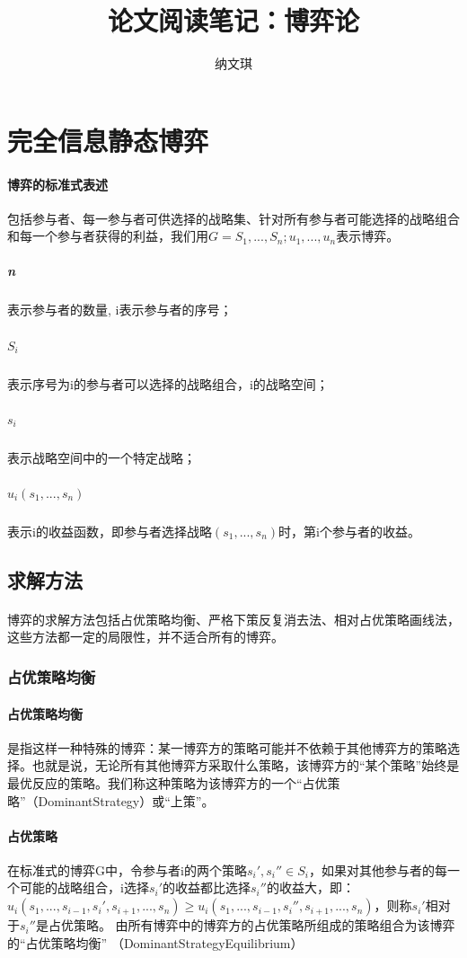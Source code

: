 \documentclass[12pt,a4paper]{article}
\begin{document}

\title{论文阅读笔记：博弈论}
\author{纳文琪}
\maketitle

\section{完全信息静态博弈}
\paragraph{博弈的标准式表述} 包括参与者、每一参与者可供选择的战略集、针对所有参与者可能选择的战略组合和每一个参与者获得的利益，我们用$G={S_1,...,S_n;u_1,...,u_n}$表示博弈。
	\subparagraph{n} 表示参与者的数量, i表示参与者的序号；
	\subparagraph{$S_i$} 表示序号为i的参与者可以选择的战略组合，i的战略空间；
	\subparagraph{$s_i$} 表示战略空间中的一个特定战略；
	\subparagraph{$u_i(s_1,...,s_n)$} 表示i的收益函数，即参与者选择战略$(s_1,...,s_n)$时，第i个参与者的收益。
\subsection{求解方法}	
\paragraph{} 博弈的求解方法包括占优策略均衡、严格下策反复消去法、相对占优策略画线法，这些方法都一定的局限性，并不适合所有的博弈。
\subsubsection{占优策略均衡}
\paragraph{占优策略均衡} 是指这样一种特殊的博弈：某一博弈方的策略可能并不依赖于其他博弈方的策略选择。也就是说，无论所有其他博弈方采取什么策略，该博弈方的“某个策略”始终是最优反应的策略。我们称这种策略为该博弈方的一个“占优策略”（DominantStrategy）或“上策”。
\paragraph{占优策略} 在标准式的博弈G中，令参与者i的两个策略${s_i}',{s_i}'' \in S_i$，如果对其他参与者的每一个可能的战略组合，i选择${s_i}'$的收益都比选择${s_i}''$的收益大，即：$u_i(s_1,...,s_{i-1},{s_i}',s_{i+1},...,s_n) \geq u_i(s_1,...,s_{i-1},{s_i}'',s_{i+1},...,s_n)$，则称${s_i}'$相对于${s_i}''$是占优策略。
由所有博弈中的博弈方的占优策略所组成的策略组合为该博弈的“占优策略均衡” （DominantStrategyEquilibrium）
\end{document}
